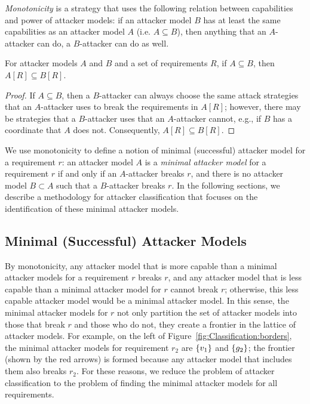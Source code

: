 \emph{Monotonicity} is a strategy that uses the following relation between capabilities and power of attacker models: if an attacker model $B$ has at least the same capabilities as an attacker model $A$ (i.e. $A\subseteq B$), then anything that an $A$-attacker can do, a $B$-attacker can do as well.
\begin{proposition}[Monotonicity]
\label{theo:monotonicity}
For attacker models $A$ and $B$ and a set of requirements $R$, if $A\subseteq B$, then $A[R]\subseteq B[R]$.
\end{proposition}
\begin{proof}
If $A\subseteq B$, then a $B$-attacker can always choose the same attack strategies that an $A$-attacker uses to break the requirements in $A[R]$; however, there may be strategies that a $B$-attacker uses that an $A$-attacker cannot, e.g., if $B$ has a coordinate that $A$ does not. Consequently, $A[R]\subseteq B[R]$.
\end{proof}
We use monotonicity to define a notion of {minimal (successful) attacker model} for a requirement $r$: an attacker model $A$ is a \emph{minimal attacker model} for a requirement $r$ if and only if an $A$-attacker breaks $r$, and there is no attacker model $B\subset A$ such that a $B$-attacker breaks $r$. In the following sections, we describe a methodology for attacker classification that focuses on the identification of these minimal attacker models. %

\subsection{Minimal (Successful) Attacker Models}
By monotonicity, any attacker model that is more capable than a minimal attacker models for a requirement $r$ breaks $r$, and any attacker model that is less capable than a minimal attacker model for $r$ cannot break $r$; otherwise, this less capable attacker model would be a minimal attacker model. In this sense, the minimal attacker models for $r$ not only partition the set of attacker models into those that break $r$ and those who do not, they create a frontier in the lattice of attacker models. For example, on the left of Figure~\ref{fig:Classification:borders}, the minimal attacker models for requirement $r_2$ are $\left\{v_1\right\}$ and $\left\{g_2\right\}$; the frontier (shown by the red arrows) is formed because any attacker model that includes them also breaks $r_2$. For these reasons, we reduce the problem of attacker classification to the problem of finding the minimal attacker models for all requirements.

